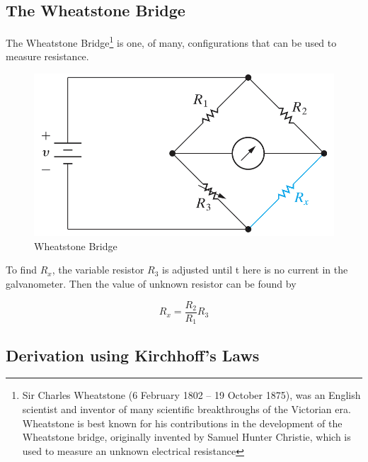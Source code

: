\documentclass[14pt]{memoir}
\begin{document}
\subsection{The Wheatstone Bridge}
The Wheatstone Bridge\footnote{Sir Charles Wheatstone (6 February 1802 – 19 October 1875), was an English scientist and inventor of many scientific breakthroughs of the Victorian era.  Wheatstone is best known for his contributions in the development of the Wheatstone bridge, originally invented by Samuel Hunter Christie, which is used to measure an unknown electrical resistance} is one, of many, configurations that can be used to measure resistance. 

\begin{figure}[H]
\begin{center}
\includegraphics[scale=0.50]{fig/fig03_28.png}
\caption{Wheatstone Bridge}
\label{fig:fig03_28}
\end{center}
\end{figure}

To find $R_x$, the variable resistor $R_3$ is adjusted until t here is no current in the galvanometer.  Then the value of unknown resistor can be found by

\begin{equation}
R_x = \frac{R_2}{R_1}R_3
\end{equation}

\subsection{Derivation using Kirchhoff's Laws}
\end{document}
